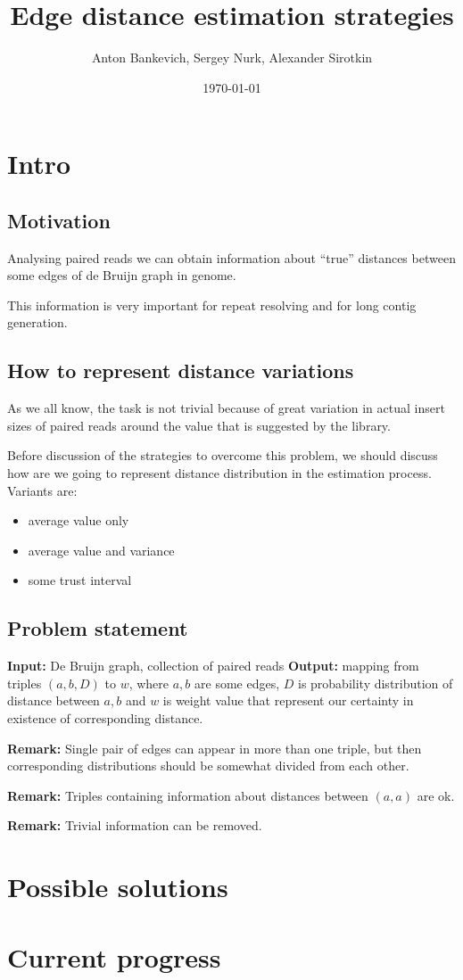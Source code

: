 \documentclass[12pt]{article}
\title{Edge distance estimation strategies}
\author{Anton Bankevich, Sergey Nurk, Alexander Sirotkin}
\date{\today}
\newcommand{\remark}[1]{\textbf{Remark:} #1}
\newcommand{\dbg}{de Bruijn graph}
\newcommand{\Dbg}{De Bruijn graph}
\begin{document}
\maketitle

\tableofcontents

\section{Intro}

\subsection{Motivation}
Analysing paired reads we can obtain information about ``true'' distances between some edges of \dbg{} in genome.

This information is very important for repeat resolving and for long contig generation.

\subsection{How to represent distance variations}
As we all know, the task is not trivial because of great variation in actual insert sizes of paired reads around the value that is suggested by the library.

Before discussion of the strategies to overcome this problem, we should discuss how are we going to represent distance distribution in the estimation process. 
Variants are:
\begin{itemize}
\item average value only
\item average value and variance
\item some trust interval
\end{itemize}

\subsection{Problem statement}

\textbf{Input:} \Dbg{}, collection of paired reads
\textbf{Output:} mapping from triples $(a,b,D)$ to $w$, where $a,b$ are some edges, $D$ is probability distribution of distance between $a,b$ and $w$ is weight value that represent our certainty in existence of corresponding distance.

\remark{Single pair of edges can appear in more than one triple, but then corresponding distributions should be somewhat divided from each other.}

\remark{Triples containing information about distances between $(a,a)$ are ok.}

\remark{Trivial information can be removed.}

\section{Possible solutions}

\section{Current progress}
\end{document}
